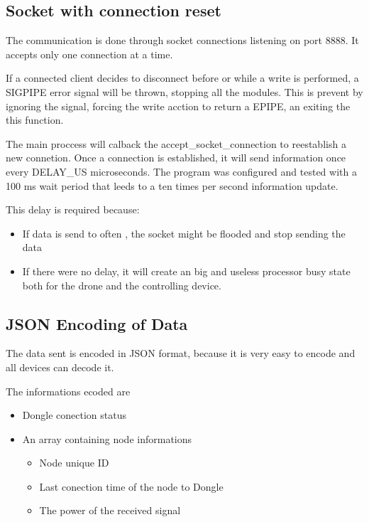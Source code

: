 \subsection{Socket with connection reset}

The communication is done through socket connections listening on port 8888. It accepts only one connection at a time.

If a connected client decides to disconnect before or while a write is performed, a SIGPIPE error signal will be thrown, stopping all the modules. This is prevent by ignoring the signal, forcing the write acction to return a EPIPE, an exiting the this function.

The main proccess will calback the accept\_socket\_connection to reestablish a new connetion. Once a connection is established, it will send information once every DELAY\_US microseconds. The program was configured and tested with a 100 ms wait period that leeds to a ten times per second information update.

This delay is required because:
\begin{itemize}

\item If data is send to often , the socket might be flooded and stop sending the data
\item If there were no delay, it will create an big and useless processor busy state both for the drone and the controlling device.

\end{itemize}

 
\subsection{JSON Encoding of Data}

The data sent is encoded in JSON format, because it is very easy to encode and all devices can decode it.

The informations ecoded are
\begin{itemize}

\item Dongle conection status
\item An array containing node informations
\begin{itemize}

	\item Node unique ID
	\item Last conection time of the node to Dongle
	\item The power of the received signal

	\end{itemize}
\end{itemize}


